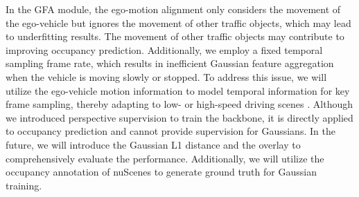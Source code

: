 \documentclass[journal]{IEEEtran}
\begin{document}



In the GFA module, the ego-motion alignment only considers the movement of the ego-vehicle but ignores the movement of other traffic objects, which may lead to underfitting results.
The movement of other traffic objects may contribute to improving occupancy prediction.
Additionally, we employ a fixed temporal sampling frame rate, which results in inefficient Gaussian feature aggregation when the vehicle is moving slowly or stopped.
To address this issue, we will utilize the ego-vehicle motion information to model temporal information for key frame sampling, thereby adapting to low- or high-speed driving scenes \cite{gao2025openfly}.
Although we introduced perspective supervision to train the backbone, it is directly applied to occupancy prediction and cannot provide supervision for Gaussians.
In the future, we will introduce the Gaussian L1 distance and the overlay to comprehensively evaluate the performance.
Additionally, we will utilize the occupancy annotation of nuScenes to generate ground truth for Gaussian training.
\end{document}
